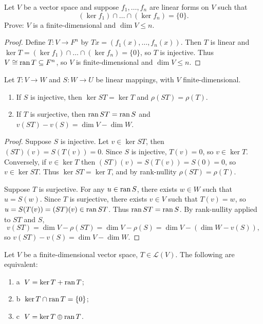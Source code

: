 \begin{tcolorbox}[title=Problem 9, breakable]
    Let $V$ be a vector space and suppose $f_1, \ldots, f_n$ are linear forms 
    on $V$ such that 
    \[(\ker f_1) \cap \ldots \cap (\ker f_n) = \{0\}.\]
    Prove: $V$ is a finite-dimensional and $\dim V \le n$.
\end{tcolorbox}

\begin{proof}
    Define $T : V \to F^n$ by $Tx = (f_1(x), \ldots, f_n(x))$. Then $T$ is linear and 
    $\ker T = (\ker f_1) \cap \ldots \cap (\ker f_n) = \{0\}$, so $T$ is injective.
    Thus $V \cong \operatorname{ran} T \subseteq F^n$, so $V$ is finite-dimensional and $\dim V \le n$.
\end{proof}


\begin{tcolorbox}[title=Problem 14, breakable]
    Let $T : V \longrightarrow W$ and $S : W \longrightarrow U$ be linear mappings,
    with $V$ finite-dimensional.
    \begin{enumerate}
        \item If $S$ is injective, then $\ker ST = \ker T$ and $\rho (ST) = \rho(T)$.
        \item If $T$ is surjective, then $\operatorname{ran} ST =\operatorname{ran} S$ and $v(ST) - v(S) = \dim V - \dim W$.
    \end{enumerate}
\end{tcolorbox}

\begin{proof}
    Suppose $S$ is injective.
    Let $v \in \ker ST$, then $(ST)(v) = S(T(v)) = 0$.
    Since $S$ is injective, $T(v) = 0$, so $v \in \ker T$.
    Conversely, if $v \in \ker T$ then $(ST)(v) = S(T(v)) = S(0) = 0$, so $v \in \ker ST$.
    Thus $\ker ST = \ker T$, and by rank-nullity $\rho(ST) = \rho(T)$.

    Suppose $T$ is surjective. For any $u \in \operatorname{ran} S$, there exists $w \in W$ such that 
    $u = S(w)$. Since $T$ is surjective, there exists $v \in V$ such that $T(v) = w$, 
    so $u = S(T(v)) = (ST)(v) \in \operatorname{ran} ST$. Thus $\operatorname{ran} ST = \operatorname{ran} S$.
    By rank-nullity applied to $ST$ and $S$,
    \[v(ST) = \dim V - \rho(ST) = \dim V - \rho(S) = \dim V - (\dim W - v(S)),\]
    so $v(ST) - v(S) = \dim V - \dim W$.
\end{proof}


\begin{tcolorbox}[title=Problem 15, breakable]
    Let $V$ be a finite-dimensional vector space, $T \in \mathcal{L}(V)$.
    The following are equivalent:
    \begin{enumerate}
        \item \textcircled{a} $V = \ker T +\operatorname{ran} T$;
        \item \textcircled{b} $\ker T \cap \operatorname{ran} T = \{0\}$;
        \item \textcircled{c} $V = \ker T \oplus\operatorname{ran} T$.
    \end{enumerate}
\end{tcolorbox}

